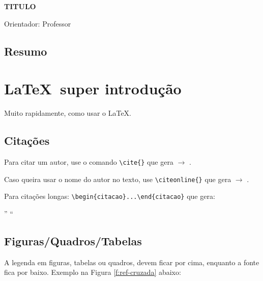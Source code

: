 \documentclass[article,11pt,oneside,a4paper,english,brazil,sumario=tradicional]{abntex2}
\begin{document}
\frenchspacing %

\begin{center}
  {\fontsize{14pt}{\baselineskip}\selectfont
  \textsf{\uppercase{\textbf{titulo}}}}
  
  {\fontsize{12pt}{\baselineskip}\selectfont
  \textsf{}}

  {\fontsize{10pt}{\baselineskip}\selectfont
  \textsf{Orientador: Professor}}
  

\end{center}

\begin{footnotesize}
\section*{Resumo}
{
 \fontsize{12pt}{\baselineskip}\selectfont
  \textit{
  \blindtext
   }

}
\end{footnotesize}
 
\textual
\pagestyle{fancy}

\section{\LaTeX ~super introdução}
Muito rapidamente, como usar o \LaTeX.

\subsection{Citações}
Para citar um autor, use o comando \verb|\cite{}| que gera $\rightarrow$ \cite{biswal1995}. 

Caso queira usar o nome do autor no texto, use \verb|\citeonline{}| que gera $\rightarrow$ .

Para citações longas: \verb|\begin{citacao}...\end{citacao}| que gera:

\begin{citacao}
'' \blindtext ``
\end{citacao}

\subsection{Figuras/Quadros/Tabelas}
A legenda em figuras, tabelas ou quadros, devem ficar por cima, enquanto a fonte fica por baixo. Exemplo na Figura \ref{f:ref-cruzada} abaixo:
\end{document}
